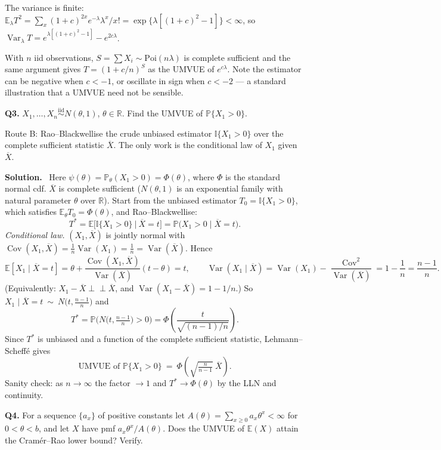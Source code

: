 \documentclass[11pt]{article}
\newcommand{\E}{\mathbb{E}}
\newcommand{\Var}{\operatorname{Var}}
\newcommand{\Cov}{\operatorname{Cov}}
\newcommand{\Prob}{\mathbb{P}}
\newcommand{\R}{\mathbb{R}}
\newcommand{\Xbar}{\overline{X}}
\newcommand{\iid}{\overset{\text{iid}}{\sim}}
\newcommand{\ind}{\perp\!\!\!\perp}
\newenvironment{prob}[1]{\medskip\noindent\textbf{\large #1}\quad}{\par}
\newcommand{\soln}{\medskip\noindent\textbf{Solution.}\ }
\begin{document}
The variance is finite:
$\E_\lambda T^2=\sum_x (1+c)^{2x}e^{-\lambda}\lambda^x/x!=\exp\{\lambda[(1+c)^2-1]\}<\infty$,
so $\Var_\lambda T=e^{\lambda[(1+c)^2-1]}-e^{2c\lambda}$.

\begin{notebox}
With $n$ iid observations, $S=\sum X_i\sim\mathrm{Poi}(n\lambda)$ is complete sufficient and
the same argument gives $T=(1+c/n)^{S}$ as the UMVUE of $e^{c\lambda}$. Note the estimator can
be negative when $c<-1$, or oscillate in sign when $c<-2$ --- a standard illustration that a
UMVUE need not be sensible.
\end{notebox}

\bigskip
\begin{prob}{Q3.}
$X_1,\dots,X_n\iid N(\theta,1)$, $\theta\in\R$. Find the UMVUE of $\Prob\{X_1>0\}$.
\end{prob}

\begin{ideabox}
Route B: Rao--Blackwellise the crude unbiased estimator $\mathbb{I}\{X_1>0\}$ over the
complete sufficient statistic $\Xbar$. The only work is the conditional law of $X_1$ given
$\Xbar$.
\end{ideabox}

\soln
Here $\psi(\theta)=\Prob_\theta(X_1>0)=\Phi(\theta)$, where $\Phi$ is the standard normal cdf.
$\Xbar$ is complete sufficient ($N(\theta,1)$ is an exponential family with natural parameter
$\theta$ over $\R$). Start from the unbiased estimator $T_0=\mathbb{I}\{X_1>0\}$, which
satisfies $\E_\theta T_0=\Phi(\theta)$, and Rao--Blackwellise:
\[
T^*=\E\big[\mathbb{I}\{X_1>0\}\ \big|\ \Xbar=t\big]=\Prob\big(X_1>0\mid \Xbar=t\big).
\]
\emph{Conditional law.} $(X_1,\Xbar)$ is jointly normal with
$\Cov(X_1,\Xbar)=\tfrac1n\Var(X_1)=\tfrac1n=\Var(\Xbar)$. Hence
\[
\E[X_1\mid\Xbar=t]=\theta+\frac{\Cov(X_1,\Xbar)}{\Var(\Xbar)}(t-\theta)=t,\qquad
\Var(X_1\mid\Xbar)=\Var(X_1)-\frac{\Cov^2}{\Var(\Xbar)}=1-\frac1n=\frac{n-1}{n}.
\]
(Equivalently: $X_1-\Xbar\ind\Xbar$, and $\Var(X_1-\Xbar)=1-1/n$.) So
$X_1\mid\Xbar=t\ \sim\ N\!\big(t,\tfrac{n-1}{n}\big)$ and
\[
T^*=\Prob\Big(N\big(t,\tfrac{n-1}{n}\big)>0\Big)
=\Phi\!\left(\frac{t}{\sqrt{(n-1)/n}}\right).
\]
Since $T^*$ is unbiased and a function of the complete sufficient statistic,
Lehmann--Scheff\'e gives
\[
\boxed{\ \text{UMVUE of }\Prob\{X_1>0\}\ =\ \Phi\!\left(\sqrt{\tfrac{n}{n-1}}\ \Xbar\right).\ }
\]
Sanity check: as $n\to\infty$ the factor $\to1$ and $T^*\to\Phi(\theta)$ by the LLN and
continuity. \checkmark

\bigskip
\begin{prob}{Q4.}
For a sequence $\{a_x\}$ of positive constants let $A(\theta)=\sum_{x\ge0}a_x\theta^x<\infty$
for $0<\theta<b$, and let $X$ have pmf $a_x\theta^x/A(\theta)$. Does the UMVUE of $\E(X)$
attain the Cram\'er--Rao lower bound? Verify.
\end{prob}
\end{document}
